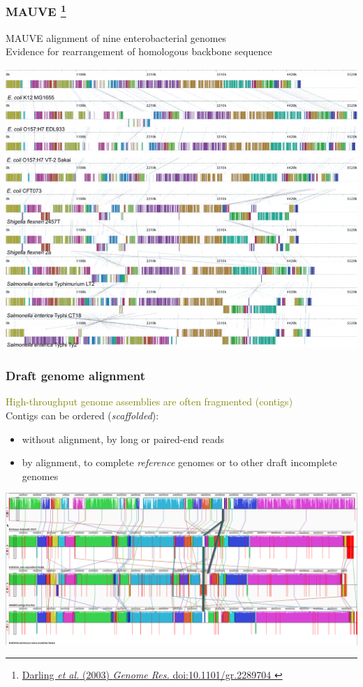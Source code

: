 %
\begin{frame}
  \frametitle{MAUVE
  \footnote{\tiny{\href{http://dx.doi.org/10.1101/gr.2289704
}{Darling \textit{et al.} (2003) \textit{Genome Res.} doi:10.1101/gr.2289704
}}}
  }
  MAUVE alignment of nine enterobacterial genomes \\
  \textcolor{hutton_green}{Evidence for rearrangement of homologous backbone sequence}
  \begin{center}
    \includegraphics[height=0.6\textheight]{images/mauve_entero}
  \end{center}    
\end{frame}

%
\begin{frame}
  \frametitle{Draft genome alignment}
  \textcolor{olive}{High-throughput genome assemblies are often fragmented (contigs)} \\
  Contigs can be ordered (\textit{scaffolded}):
  \begin{itemize}
    \item \textcolor{hutton_blue}{without alignment}, by long or paired-end reads
    \item \textcolor{hutton_purple}{by alignment}, to complete \textit{reference} genomes or to other draft incomplete genomes
  \end{itemize}
  \begin{center}
    \includegraphics[width=\textwidth]{images/mauve_scaffolding}
  \end{center}    
\end{frame}

